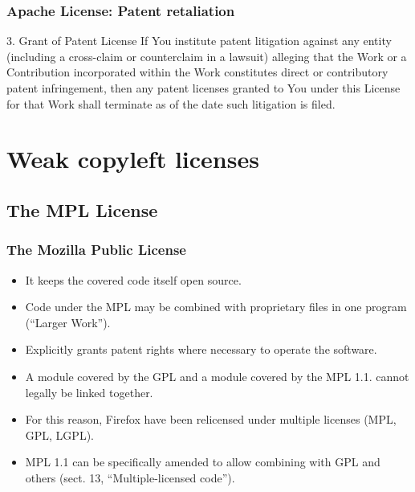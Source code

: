 \documentclass{beamer}
\begin{document}

\begin{frame}
\frametitle{Apache License: Patent retaliation}

\begin{block}{3. Grant of Patent License}
\alert{If You institute patent litigation against any entity} (including a cross-claim or counterclaim in a lawsuit) alleging that the Work or a Contribution incorporated within the Work constitutes direct or contributory patent infringement, then \alert{any patent licenses granted to You under this License} for that Work \alert{shall terminate as of the date such litigation is filed}.
\end{block}

\end{frame}



\section{Weak copyleft licenses}
\subsection{The MPL License}
\begin{frame}
\frametitle{The Mozilla Public License}

\begin{itemize}
\item It keeps the covered code itself open source.
\item Code under the MPL may be combined with proprietary files in one program (``Larger Work'').
\item Explicitly grants patent rights where necessary to operate the software.
\item A module covered by the GPL and a module covered by the MPL 1.1. cannot legally be linked together.
\item For this reason, Firefox have been relicensed under multiple licenses (MPL, GPL, LGPL).
\item MPL 1.1 can be specifically amended to allow combining with GPL and others (sect. 13, ``Multiple-licensed code'').
\end{itemize}

\end{frame}
\end{document}
